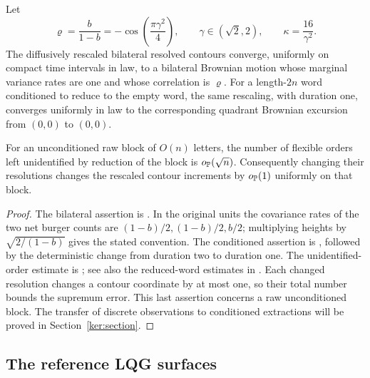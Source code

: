 \begin{theorem}\label{enc:contour-limits}
Let
\[
 \varrho=\frac b{1-b}=-\cos\left(\frac{\pi\gamma^2}{4}\right),
 \qquad \gamma\in(\sqrt2,2),\qquad \kappa=\frac{16}{\gamma^2}.
\]
The diffusively rescaled bilateral resolved contours converge, uniformly
on compact time intervals in law, to a bilateral Brownian motion whose
marginal variance rates are one and whose correlation is $\varrho$.
For a length-$2n$ word conditioned to reduce to the empty word, the same
rescaling, with duration one, converges uniformly in law to the corresponding
quadrant Brownian excursion from $(0,0)$ to $(0,0)$.

For an unconditioned raw block of $O(n)$ letters, the number of flexible
orders left unidentified by reduction of the block is $o_{\mathbb P}(\sqrt n)$.
Consequently changing their resolutions changes the rescaled contour
increments by $o_{\mathbb P}(1)$ uniformly on that block.
\end{theorem}

\begin{proof}
The bilateral assertion is \cite[Theorem 2.5]{SheffieldInventory}.
In the original units the covariance rates of the two net burger counts
are $(1-b)/2,(1-b)/2,b/2$; multiplying heights by
$\sqrt{2/(1-b)}$ gives the stated convention.  The conditioned assertion is
\cite[Theorem 1.8]{GwynneSunFKIII}, followed by the deterministic change
from duration two to duration one.  The unidentified-order estimate is
\cite[Remark 3.17]{SheffieldInventory}; see also the reduced-word estimates
in \cite{GwynneMaoSunFKI}.  Each changed resolution changes a contour
coordinate by at most one, so their total number bounds the supremum error.
This last assertion concerns a raw unconditioned block.  The transfer of
discrete observations to conditioned extractions will be proved in
Section~\ref{ker:section}.
\end{proof}

\subsection{The reference LQG surfaces}

